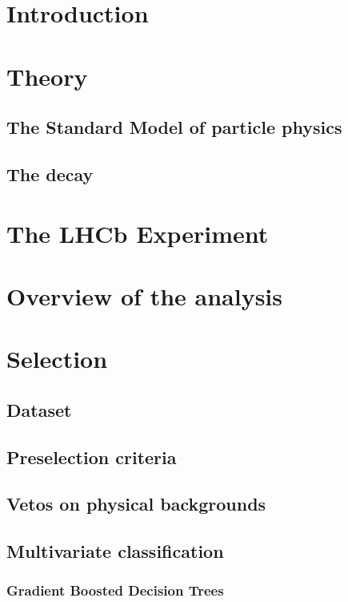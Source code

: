
\chapter{Introduction}

\chapter{Theory}

\section{The Standard Model of particle physics}

\section[The decay \decay]{The decay \bolddecay}

\chapter{The LHCb Experiment}

\chapter{Overview of the analysis}

\chapter{Selection}

\section{Dataset}

\section{Preselection criteria}

\section{Vetos on physical backgrounds}

\section{Multivariate classification}
\subsection{Gradient Boosted Decision Trees}
